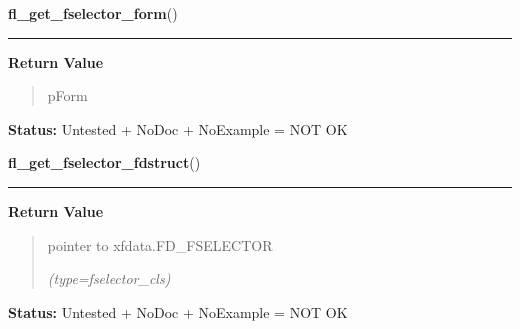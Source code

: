 \hspace{.8\funcindent}\begin{boxedminipage}{\funcwidth}

    \raggedright \textbf{fl\_get\_fselector\_form}()

    \vspace{-1.5ex}

    \rule{\textwidth}{0.5\fboxrule}
\setlength{\parskip}{2ex}
\setlength{\parskip}{1ex}
      \textbf{Return Value}
    \vspace{-1ex}

      \begin{quote}
      pForm

      \end{quote}

\textbf{Status:} Untested + NoDoc + NoExample = NOT OK



    \end{boxedminipage}

    \label{xformslib:library:fl_get_fselector_fdstruct}

    \vspace{0.5ex}

\hspace{.8\funcindent}\begin{boxedminipage}{\funcwidth}

    \raggedright \textbf{fl\_get\_fselector\_fdstruct}()

    \vspace{-1.5ex}

    \rule{\textwidth}{0.5\fboxrule}
\setlength{\parskip}{2ex}
\setlength{\parskip}{1ex}
      \textbf{Return Value}
    \vspace{-1ex}

      \begin{quote}
      pointer to xfdata.FD\_FSELECTOR

      {\it (type=fselector\_cls)}

      \end{quote}

\textbf{Status:} Untested + NoDoc + NoExample = NOT OK



    \end{boxedminipage}

    \label{xformslib:library:fl_hide_fselector}

